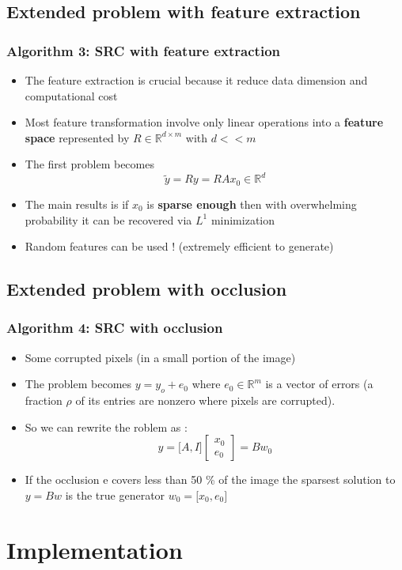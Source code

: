 \documentclass{beamer}
\begin{document}
\subsection{Extended problem with feature extraction}


\begin{frame}

		\frametitle{Algorithm 3: SRC with feature extraction}		

\begin{itemize}			
\item The feature extraction is crucial because it reduce data dimension and computational cost
\item Most feature transformation involve only linear operations into a \textbf{feature space} represented by $R \in \mathbb{R}^{d \times m}$ with $d <<m$ 
\item The first problem becomes $$\widetilde{y}=Ry=RAx_{0} \in \mathbb{R}^{d}$$
\item The main  results is if $x_{0}$ is \textbf{sparse enough} then with overwhelming probability it can be recovered via $L^{1}$ minimization
\item Random features can be used ! (extremely efficient to generate)
\end{itemize}

\end{frame}

\subsection{Extended problem with occlusion}


\begin{frame}

		\frametitle{Algorithm 4: SRC with occlusion}		

\begin{itemize}

\item Some corrupted pixels (in a small portion of the image)
\item The problem becomes $y=y_{o}+e_{0}$ where $e_{0} \in \mathbb{R}^{m}$ is a vector of errors (a fraction $\rho$ of its entries are nonzero where pixels are corrupted). 
\item So we can rewrite the roblem as : $$y = \lbrack A,I \rbrack 
\begin{bmatrix}
           x_{0} \\
           e_{0} 
\end{bmatrix}=Bw_{0}$$

\item If the occlusion e covers less than 50 \% of the image the sparsest solution to $y=Bw$ is the true generator $w_{0}=\lbrack x_{0},e_{0} \rbrack $


\end{itemize}

\end{frame}


\section{Implementation}




\end{document}
